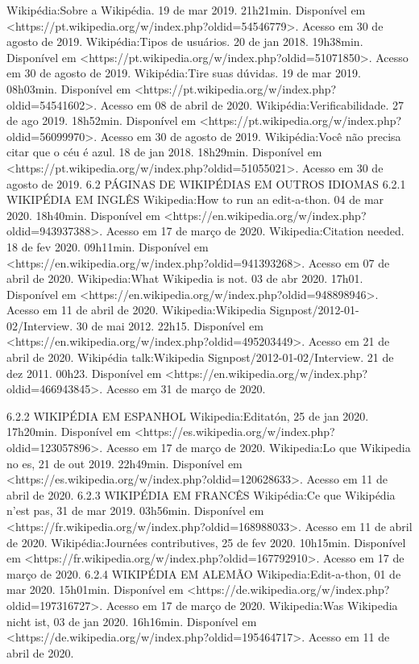 Wikipédia:Sobre a Wikipédia. 19 de mar 2019. 21h21min. Disponível em <https://pt.wikipedia.org/w/index.php?oldid=54546779>. Acesso em 30 de agosto de 2019.
Wikipédia:Tipos de usuários. 20 de jan 2018. 19h38min. Disponível em <https://pt.wikipedia.org/w/index.php?oldid=51071850>. Acesso em 30 de agosto de 2019.
Wikipédia:Tire suas dúvidas. 19 de mar 2019. 08h03min. Disponível em <https://pt.wikipedia.org/w/index.php?oldid=54541602>. Acesso em 08 de abril de 2020.
Wikipédia:Verificabilidade. 27 de ago 2019. 18h52min. Disponível em <https://pt.wikipedia.org/w/index.php?oldid=56099970>. Acesso em 30 de agosto de 2019.
Wikipédia:Você não precisa citar que o céu é azul. 18 de jan 2018. 18h29min. Disponível em <https://pt.wikipedia.org/w/index.php?oldid=51055021>. Acesso em 30 de agosto de 2019.
6.2 PÁGINAS DE WIKIPÉDIAS EM OUTROS IDIOMAS
6.2.1 WIKIPÉDIA EM INGLÊS
Wikipedia:How to run an edit-a-thon. 04 de mar 2020. 18h40min. Disponível em <https://en.wikipedia.org/w/index.php?oldid=943937388>. Acesso em 17 de março de 2020.
Wikipedia:Citation needed. 18 de fev 2020. 09h11min. Disponível em <https://en.wikipedia.org/w/index.php?oldid=941393268>. Acesso em 07 de abril de 2020.
Wikipedia:What Wikipedia is not. 03 de abr 2020. 17h01. Disponível em <https://en.wikipedia.org/w/index.php?oldid=948898946>. Acesso em 11 de abril de 2020.
Wikipedia:Wikipedia Signpost/2012-01-02/Interview. 30 de mai 2012. 22h15. Disponível em <https://en.wikipedia.org/w/index.php?oldid=495203449>. Acesso em 21 de abril de 2020.
Wikipédia talk:Wikipedia Signpost/2012-01-02/Interview. 21 de dez 2011. 00h23. Disponível em <https://en.wikipedia.org/w/index.php?oldid=466943845>. Acesso em 31 de março de 2020.

6.2.2 WIKIPÉDIA EM ESPANHOL
Wikipedia:Editatón, 25 de jan 2020. 17h20min. Disponível em <https://es.wikipedia.org/w/index.php?oldid=123057896>. Acesso em 17 de março de 2020.
Wikipedia:Lo que Wikipedia no es, 21 de out 2019. 22h49min. Disponível em <https://es.wikipedia.org/w/index.php?oldid=120628633>. Acesso em 11 de abril de 2020.
6.2.3 WIKIPÉDIA EM FRANCÊS
Wikipédia:Ce que Wikipédia n'est pas, 31 de mar 2019. 03h56min. Disponível em <https://fr.wikipedia.org/w/index.php?oldid=168988033>. Acesso em 11 de abril de 2020.
Wikipédia:Journées contributives, 25 de fev 2020. 10h15min. Disponível em <https://fr.wikipedia.org/w/index.php?oldid=167792910>. Acesso em 17 de março de 2020.
6.2.4 WIKIPÉDIA EM ALEMÃO
Wikipedia:Edit-a-thon, 01 de mar 2020. 15h01min. Disponível em <https://de.wikipedia.org/w/index.php?oldid=197316727>. Acesso em 17 de março de 2020.
Wikipedia:Was Wikipedia nicht ist, 03 de jan 2020. 16h16min. Disponível em <https://de.wikipedia.org/w/index.php?oldid=195464717>. Acesso em 11 de abril de 2020.
